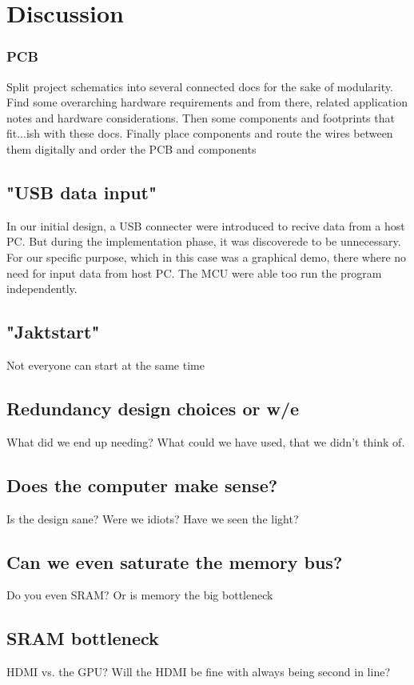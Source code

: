\documentclass[../main/report.tex]{subfiles}
\begin{document}
\chapter{Discussion}



\subsection{PCB}
Split project schematics into several connected docs for the sake of modularity. Find some overarching hardware requirements and from there, related application notes and hardware considerations. Then some components and footprints that fit...ish with these docs.
Finally place components and route the wires between them digitally and order the PCB and components

\section{"USB data input"}
In our initial design, a USB connecter were introduced to recive data from a host PC. 
But during the implementation phase, it was discoverede to be unnecessary.
For our specific purpose, which in this case was a graphical demo, there where no need for input data from host PC. 
The MCU were able too run the program independently.

\section{"Jaktstart"}

Not everyone can start at the same time

\section{Redundancy design choices or w/e}
What did we end up needing?
What could we have used, that we didn't think of.

\section{Does the computer make sense?}
Is the design sane?
Were we idiots?
Have we seen the light?

\section{Can we even saturate the memory bus?}
Do you even SRAM?
Or is memory the big bottleneck

\section{SRAM bottleneck}
HDMI vs. the GPU?
Will the HDMI be fine with always being second in line?
\end{document}
